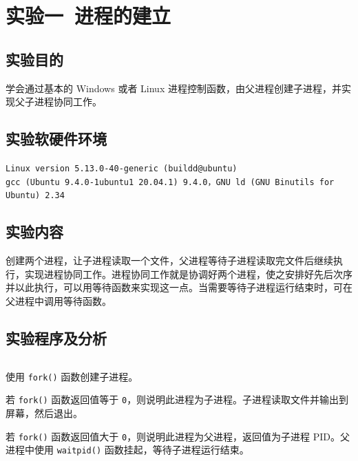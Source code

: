 \documentclass{article}
\begin{document}
	\section{实验一\ 进程的建立}
		\subsection{实验目的}
			学会通过基本的 Windows 或者 Linux 进程控制函数，由父进程创建子进程，并实现父子进程协同工作。

		\subsection{实验软硬件环境}
			\texttt{Linux version 5.13.0-40-generic (buildd@ubuntu) \\ gcc (Ubuntu 9.4.0-1ubuntu1~20.04.1) 9.4.0，GNU ld (GNU Binutils for Ubuntu) 2.34}

		\subsection{实验内容}
			创建两个进程，让子进程读取一个文件，父进程等待子进程读取完文件后继续执行，实现进程协同工作。进程协同工作就是协调好两个进程，使之安排好先后次序并以此执行，可以用等待函数来实现这一点。当需要等待子进程运行结束时，可在父进程中调用等待函数。

		\subsection{实验程序及分析}
			\inputminted[linenos,breaklines,tabsize=4]{c}{lib1/lib1.c}

			使用 \texttt{fork()} 函数创建子进程。

			若 \texttt{fork()} 函数返回值等于 \texttt{0}，则说明此进程为子进程。子进程读取文件并输出到屏幕，然后退出。

			若 \texttt{fork()} 函数返回值大于 \texttt{0}，则说明此进程为父进程，返回值为子进程 PID。父进程中使用 \texttt{waitpid()} 函数挂起，等待子进程运行结束。
\end{document}

